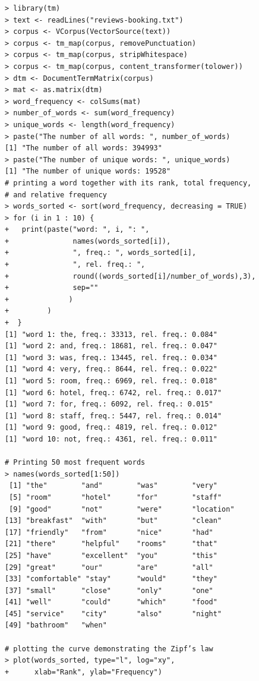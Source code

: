 \begin{verbatim}
> library(tm)
> text <- readLines("reviews-booking.txt")
> corpus <- VCorpus(VectorSource(text))
> corpus <- tm_map(corpus, removePunctuation)
> corpus <- tm_map(corpus, stripWhitespace)
> corpus <- tm_map(corpus, content_transformer(tolower))
> dtm <- DocumentTermMatrix(corpus)
> mat <- as.matrix(dtm)
> word_frequency <- colSums(mat)
> number_of_words <- sum(word_frequency)
> unique_words <- length(word_frequency)
> paste("The number of all words: ", number_of_words)
[1] "The number of all words: 394993"
> paste("The number of unique words: ", unique_words)
[1] "The number of unique words: 19528"
# printing a word together with its rank, total frequency,
# and relative frequency
> words_sorted <- sort(word_frequency, decreasing = TRUE)
> for (i in 1 : 10) {
+   print(paste("word: ", i, ": ",
+               names(words_sorted[i]),
+               ", freq.: ", words_sorted[i],
+               ", rel. freq.: ",
+               round((words_sorted[i]/number_of_words),3),
+               sep=""
+              )
+         )
+  }
[1] "word 1: the, freq.: 33313, rel. freq.: 0.084"
[1] "word 2: and, freq.: 18681, rel. freq.: 0.047"
[1] "word 3: was, freq.: 13445, rel. freq.: 0.034"
[1] "word 4: very, freq.: 8644, rel. freq.: 0.022"
[1] "word 5: room, freq.: 6969, rel. freq.: 0.018"
[1] "word 6: hotel, freq.: 6742, rel. freq.: 0.017"
[1] "word 7: for, freq.: 6092, rel. freq.: 0.015"
[1] "word 8: staff, freq.: 5447, rel. freq.: 0.014"
[1] "word 9: good, freq.: 4819, rel. freq.: 0.012"
[1] "word 10: not, freq.: 4361, rel. freq.: 0.011"

# Printing 50 most frequent words
> names(words_sorted[1:50])
 [1] "the"        "and"        "was"        "very"
 [5] "room"       "hotel"      "for"        "staff"
 [9] "good"       "not"        "were"       "location"
[13] "breakfast"  "with"       "but"        "clean"
[17] "friendly"   "from"       "nice"       "had"
[21] "there"      "helpful"    "rooms"      "that"
[25] "have"       "excellent"  "you"        "this"
[29] "great"      "our"        "are"        "all"
[33] "comfortable" "stay"      "would"      "they"
[37] "small"      "close"      "only"       "one"
[41] "well"       "could"      "which"      "food"
[45] "service"    "city"       "also"       "night"
[49] "bathroom"   "when"

# plotting the curve demonstrating the Zipf’s law
> plot(words_sorted, type="l", log="xy",
+      xlab="Rank", ylab="Frequency")
\end{verbatim}

